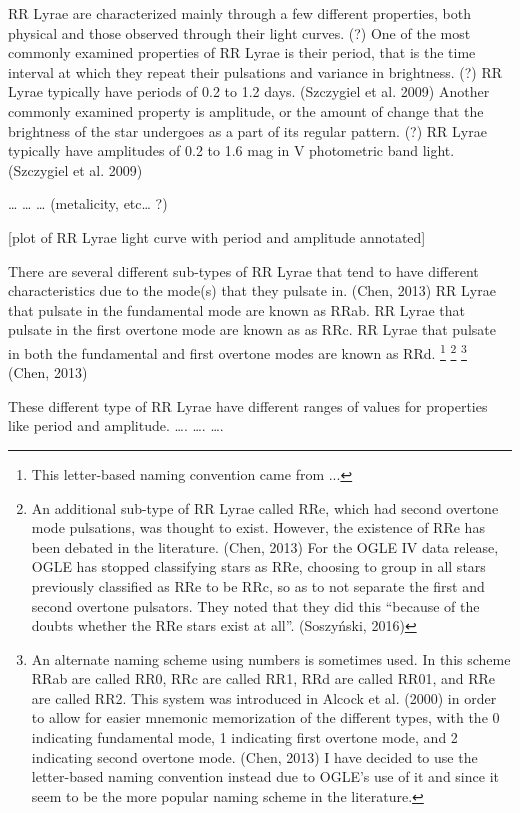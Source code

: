 \documentclass[]{article}
\begin{document}
RR Lyrae are characterized mainly through a few different properties, both physical and those observed through their light curves. (?) One of the most commonly examined properties of RR Lyrae is their period, that is the time interval at which they repeat their pulsations and variance in brightness. (?) RR Lyrae typically have periods of 0.2 to 1.2 days. (Szczygiel et al. 2009) Another commonly examined property is amplitude, or the amount of change that the brightness of the star undergoes as a part of its regular pattern. (?) RR Lyrae typically have amplitudes of 0.2 to 1.6 mag in V photometric band light. (Szczygiel et al. 2009)

… … … (metalicity, etc… ?)

[plot of RR Lyrae light curve with period and amplitude annotated]

There are several different sub-types of RR Lyrae that tend to have different characteristics due to the mode(s) that they pulsate in. (Chen, 2013) RR Lyrae that pulsate in the fundamental mode are known as RRab. RR Lyrae that pulsate in the first overtone mode are known as as RRc. RR Lyrae that pulsate in both the fundamental and first overtone modes are known as RRd. \footnote{This letter-based naming convention came from ...} \footnote{An additional sub-type of RR Lyrae called RRe, which had second overtone mode pulsations, was thought to exist. However, the existence of RRe has been debated in the literature. (Chen, 2013) For the OGLE IV data release, OGLE has stopped classifying stars as RRe, choosing to group in all stars previously classified as RRe to be RRc, so as to not separate the first and second overtone pulsators. They noted that they did this “because of the doubts whether the RRe stars exist at all”. (Soszyński, 2016)} \footnote{An alternate naming scheme using numbers is sometimes used. In this scheme RRab are called RR0, RRc are called RR1, RRd are called RR01, and RRe are called RR2. This system was introduced in Alcock et al. (2000) in order to allow for easier mnemonic memorization of the different types, with the 0 indicating fundamental mode, 1 indicating first overtone mode, and 2 indicating second overtone mode. (Chen, 2013) I have decided to use the letter-based naming convention instead due to OGLE’s use of it and since it seem to be the more popular naming scheme in the literature.} (Chen, 2013)

These different type of RR Lyrae have different ranges of values for properties like period and amplitude. …. …. ….
\end{document}
